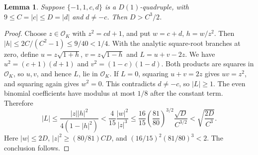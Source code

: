 \documentclass[12pt]{article}
\newtheorem{lemma}[theorem]{Lemma}
\newcommand{\OK}{\mathcal O_K}
\numberwithin{equation}{section}
\begin{document}
\begin{lemma}\label{sm:five-unit-cubic}
Suppose $\{-1,1,c,d\}$ is a $D(1)$-quadruple, with
$9\le C=|c|\le D=|d|$ and $d\ne-c$. Then $D>C^3/2$.
\end{lemma}
\begin{proof}
Choose $z\in\OK$ with $z^2=cd+1$, and put $w=c+d$, $h=w/z^2$.
Then $|h|\le2C/(C^2-1)\le9/40<1/4$.
With the analytic square-root branches at zero, define
$u=z\sqrt{1+h}$, $v=z\sqrt{1-h}$ and $L=u+v-2z$.
We have $u^2=(c+1)(d+1)$ and $v^2=(1-c)(1-d)$.
Both products are squares in $\OK$, so $u,v$, and hence $L$, lie in $\OK$.
If $L=0$, squaring $u+v=2z$ gives $uv=z^2$, and squaring again gives
$w^2=0$. This contradicts $d\ne-c$, so $|L|\ge1$.
The even binomial coefficients have modulus at most $1/8$ after the
constant term. Therefore
\[
 |L|\le\frac{|z||h|^2}{4(1-|h|^2)}
 <\frac4{15}\frac{|w|^2}{|z|^3}
 \le\frac{16}{15}\left(\frac{81}{80}\right)^{3/2}
       \frac{\sqrt D}{C^{3/2}}
 <\sqrt{\frac{2D}{C^3}}.
\]
Here $|w|\le2D$, $|z|^2\ge(80/81)CD$, and
$(16/15)^2(81/80)^3<2$. The conclusion follows.
\end{proof}
\end{document}
